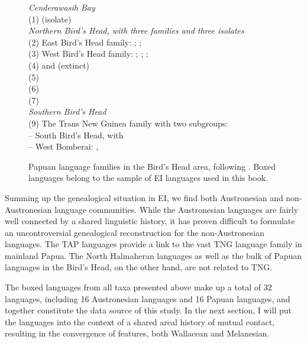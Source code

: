 \begin{figure}[ht]
\begin{footnotesize}
\textit{Cenderawasih Bay} \\
(1)  (isolate) \\

\textit{Northern Bird’s Head, with three families and three isolates} \\
(2) East Bird’s Head family: ; ;  \\
(3) West Bird’s Head family: ; ; ;  \\
(4)  and (extinct)  \\
(5)  \\
(6)  \\
(7)  \\

\textit{Southern Bird’s Head} \\
(9) The Trans New Guinea family with two subgroups: \\
– South Bird’s Head, with  \\
– West Bomberai: ,  \\
\end{footnotesize}
\caption[The Papuan languages of the Bird's Head]{Papuan language families in the Bird's Head area, following \citet{klamer2008east}. Boxed languages belong to the sample of EI languages used in this book.}
\end{figure}
\FloatBarrier

Summing up the genealogical situation in EI, we find both Austronesian and non-Austronesian language communities. While the Austronesian languages are fairly well connected by a shared linguistic history, it has proven difficult to formulate an uncontroversial genealogical reconstruction for the non-Austronesian languages. The TAP languages provide a link to the vast TNG language family in mainland Papua. The North Halmaheran languages as well as the bulk of Papuan languages in the Bird's Head, on the other hand, are not related to TNG. 

The boxed languages from all taxa presented above make up a total of 32 languages, including 16 Austronesian languages and 16 Papuan languages, and together constitute the data source of this study. In the next section, I will put the languages into the context of a shared areal history of mutual contact, resulting in the convergence of features, both Wallacean and Melanesian.

